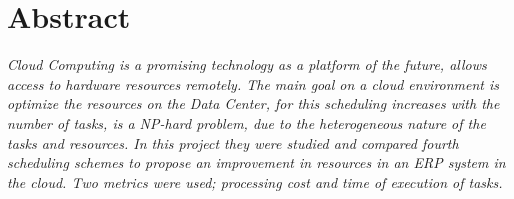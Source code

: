 \chapter*{Abstract}

 \textit{Cloud Computing is a promising technology as a platform of the future, allows access to hardware resources remotely. The main goal on a cloud environment is optimize the resources on the Data Center, for this scheduling increases with the number of tasks, is a NP-hard problem, due to the heterogeneous nature of the tasks and resources.
In this project they were studied and compared fourth scheduling schemes to propose an improvement in resources in an ERP system in the cloud. Two metrics were used; processing cost and time of execution of tasks.}



